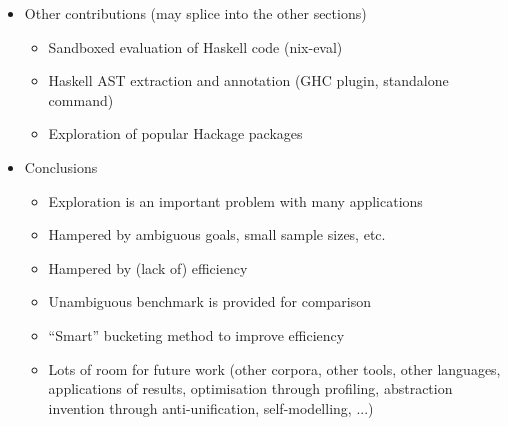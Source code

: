 \documentclass{article}
\begin{document}
\begin{itemize}
\item Other contributions (may splice into the other sections)
  \begin{itemize}
    \item Sandboxed evaluation of Haskell code (nix-eval)
    \item Haskell AST extraction and annotation (GHC plugin, standalone command)
    \item Exploration of popular Hackage packages
  \end{itemize}

\item Conclusions
  \begin{itemize}
  \item Exploration is an important problem with many applications
  \item Hampered by ambiguous goals, small sample sizes, etc.
  \item Hampered by (lack of) efficiency
  \item Unambiguous benchmark is provided for comparison
  \item ``Smart'' bucketing method to improve efficiency
  \item Lots of room for future work (other corpora, other tools, other
    languages, applications of results, optimisation through profiling,
    abstraction invention through anti-unification, self-modelling, ...)
  \end{itemize}
\end{itemize}
\end{document}
